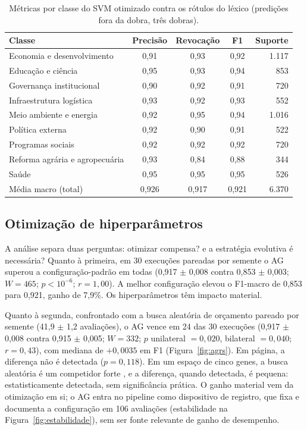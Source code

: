 \documentclass[fleqn,10pt]{SelfArx}
\begin{document}
\begin{table}[hbt]
\caption{Métricas por classe do SVM otimizado contra os rótulos do léxico (predições fora da dobra, três dobras).}
\label{tab:classes}
\centering
\footnotesize
\setlength{\tabcolsep}{3.5pt}
\begin{tabular}{lcccr}
\toprule
Classe & Precisão & Revocação & F1 & Suporte \\
\midrule
Economia e desenvolvimento & 0,91 & 0,93 & 0,92 & 1.117 \\
Educação e ciência & 0,95 & 0,93 & 0,94 & 853 \\
Governança institucional & 0,90 & 0,92 & 0,91 & 720 \\
Infraestrutura logística & 0,93 & 0,92 & 0,93 & 552 \\
Meio ambiente e energia & 0,92 & 0,95 & 0,94 & 1.016 \\
Política externa & 0,92 & 0,90 & 0,91 & 522 \\
Programas sociais & 0,92 & 0,92 & 0,92 & 720 \\
Reforma agrária e agropecuária & 0,93 & 0,84 & 0,88 & 344 \\
Saúde & 0,95 & 0,95 & 0,95 & 526 \\
\midrule
Média macro (total) & 0,926 & 0,917 & 0,921 & 6.370 \\
\bottomrule
\end{tabular}
\end{table}


\subsection{Otimização de hiperparâmetros}

A análise separa duas perguntas: otimizar compensa? e a estratégia evolutiva é necessária? Quanto à primeira, em 30 execuções pareadas por semente o AG superou a configuração-padrão em todas (0,917 $\pm$ 0,008 contra 0,853 $\pm$ 0,003; $W = 465$; $p < 10^{-6}$; $r = 1{,}00$). A melhor configuração elevou o F1-macro de 0,853 para 0,921, ganho de 7,9\%. Os hiperparâmetros têm impacto material.

Quanto à segunda, confrontado com a busca aleatória de orçamento pareado por semente (41,9 $\pm$ 1,2 avaliações), o AG vence em 24 das 30 execuções (0,917 $\pm$ 0,008 contra 0,915 $\pm$ 0,005; $W = 332$; $p$ unilateral $= 0{,}020$, bilateral $= 0{,}040$; $r = 0{,}43$), com mediana de $+0{,}0035$ em F1 (Figura~\ref{fig:agrs}). Em página, a diferença não é detectada ($p = 0{,}118$). Em um espaço de cinco genes, a busca aleatória é um competidor forte \cite{bergstra2012}, e a diferença, quando detectada, é pequena: estatisticamente detectada, sem significância prática. O ganho material vem da otimização em si; o AG entra no pipeline como dispositivo de registro, que fixa e documenta a configuração em 106 avaliações (estabilidade na Figura~\ref{fig:estabilidade}), sem ser fonte relevante de ganho de desempenho.
\end{document}

